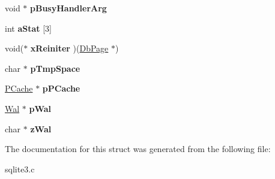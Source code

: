 \begin{DoxyCompactItemize}
\item 
void $\ast$ {\bfseries p\+Busy\+Handler\+Arg}\hypertarget{structPager_a7a685e7a8dcbcd725c5a982fd8deb91b}{}\label{structPager_a7a685e7a8dcbcd725c5a982fd8deb91b}

\item 
int {\bfseries a\+Stat} \mbox{[}3\mbox{]}\hypertarget{structPager_a0b3bb8afc7c4c82e0e99f3ad99dd0986}{}\label{structPager_a0b3bb8afc7c4c82e0e99f3ad99dd0986}

\item 
void($\ast$ {\bfseries x\+Reiniter} )(\hyperlink{structPgHdr}{Db\+Page} $\ast$)\hypertarget{structPager_ad214904b953afe7d4718a713fedb8c98}{}\label{structPager_ad214904b953afe7d4718a713fedb8c98}

\item 
char $\ast$ {\bfseries p\+Tmp\+Space}\hypertarget{structPager_a64934188c72599e0be9ae54d3fc1cc92}{}\label{structPager_a64934188c72599e0be9ae54d3fc1cc92}

\item 
\hyperlink{structPCache}{P\+Cache} $\ast$ {\bfseries p\+P\+Cache}\hypertarget{structPager_ae2495e45e354e92a858144386f91cab3}{}\label{structPager_ae2495e45e354e92a858144386f91cab3}

\item 
\hyperlink{structWal}{Wal} $\ast$ {\bfseries p\+Wal}\hypertarget{structPager_a2c759424108248d8b08e6f400fab14dd}{}\label{structPager_a2c759424108248d8b08e6f400fab14dd}

\item 
char $\ast$ {\bfseries z\+Wal}\hypertarget{structPager_ac63ab281e48f9ac8521b85c1a90475b3}{}\label{structPager_ac63ab281e48f9ac8521b85c1a90475b3}

\end{DoxyCompactItemize}


The documentation for this struct was generated from the following file\+:\begin{DoxyCompactItemize}
\item 
sqlite3.\+c\end{DoxyCompactItemize}

